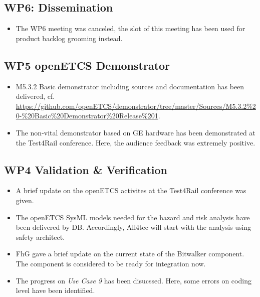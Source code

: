 \documentclass[a4paper, 11pt]{article}
\begin{document}
\subsection{WP6: Dissemination}
\begin{itemize}
\item The WP6 meeting was canceled, the slot of this meeting has been used for product backlog grooming instead.
\end{itemize}

\subsection{WP5 openETCS Demonstrator}
\begin{itemize}
\item M5.3.2 Basic demonstrator including sources and documentation has been delivered, cf. \url{https://github.com/openETCS/demonstrator/tree/master/Sources/M5.3.2%20-%20Basic%20Demonstrator%20Release%201}.
\item The non-vital demonstrator based on GE hardware has been demonstrated at the Test4Rail conference. Here, the audience feedback was extremely positive.
\end{itemize}

\subsection{WP4 Validation \& Verification}
\begin{itemize}
\item A brief update on the openETCS activites at the Test4Rail conference was given.
\item The openETCS SysML models needed for the hazard and risk analysis have been delivered by DB. Accordingly, All4tec will start with the analysis using safety architect.
\item FhG gave a brief update on the current state of the Bitwalker component. The component is considered to be ready for integration now.
\item The progress on \emph{Use Case 9} has been disucssed. Here, some errors on coding level have been identified.
\end{itemize}
\end{document}
